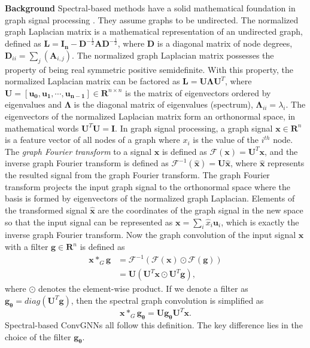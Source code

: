 	\vspace{2mm}
	\textbf{Background} Spectral-based methods have a solid mathematical foundation in graph signal processing \cite{shuman2013emerging,sandryhaila2013discrete,chen2015discrete}. They assume graphs to be undirected. The normalized graph Laplacian matrix is a mathematical representation of an undirected graph, defined as $\mathbf{L}=\mathbf{I_n}- \mathbf{D}^{-\frac{1}{2}}\mathbf{A}\mathbf{D}^{-\frac{1}{2}}$, where $\mathbf{D}$ is a diagonal matrix of node degrees, $\mathbf{D}_{ii}=\sum_j(\mathbf{A}_{i,j})$. The normalized graph Laplacian matrix possesses the property of being real symmetric positive semidefinite.  With this property, the normalized Laplacian matrix can be factored as $\mathbf{L}=\mathbf{U}\mathbf{\Lambda}\mathbf{U}^T$, where $\mathbf{U}=[\mathbf{u_0},\mathbf{u_1},\cdots,\mathbf{u_{n-1}}] \in \mathbf{R}^{n\times n}$ is the matrix of eigenvectors ordered by eigenvalues and $\mathbf{\Lambda}$ is the diagonal matrix of eigenvalues (spectrum), $\mathbf{\Lambda}_{ii}=\lambda_i$. The eigenvectors of the normalized Laplacian matrix form an orthonormal space, in mathematical words $\mathbf{U}^T\mathbf{U}=\mathbf{I}$.  In graph signal processing, a graph signal $\mathbf{x} \in  \mathbf{R}^n$ is a feature vector of all nodes of a graph where $x_i$ is the value of the $i^{th}$ node. The \textit{graph Fourier transform} to a signal $\mathbf{x}$ is defined as $\mathscr{F}(\mathbf{x}) = \mathbf{U}^T\mathbf{x}$, and the inverse graph Fourier transform  is defined as $\mathscr{F}^{-1}(\mathbf{\hat{x}}) = \mathbf{U}\hat{\mathbf{x}}$, where $\mathbf{\hat{x}}$ represents the resulted signal from the graph Fourier transform. The graph Fourier transform projects the input graph signal to the orthonormal space where the basis is formed by eigenvectors of the normalized graph Laplacian. Elements of the transformed signal $\mathbf{\hat{x}}$  are the coordinates of the graph signal in the new space so that the input signal can be represented as $\mathbf{x}=\sum_i \hat{x}_i\mathbf{u}_i$, which is exactly the inverse graph Fourier transform. Now the graph convolution of the input signal $\mathbf{x}$ with a filter $\mathbf{g}\in \mathbf{R}^n$ is defined as 
	\begin{equation}
	\label{eq:graphconv}
	\begin{aligned}
	\mathbf{x} \ast_G \mathbf{g}&= \mathscr{F}^{-1}(\mathscr{F}(\mathbf{x})\odot\mathscr{F}(\mathbf{g})) \\
	&  = \mathbf{U}(\mathbf{U}^T\mathbf{x}\odot \mathbf{U}^T \mathbf{g}),
	\end{aligned}
	\end{equation}
	where $\odot$ denotes the element-wise product.  If we denote a filter as $\mathbf{g_\theta} = diag(\mathbf{U}^T\mathbf{g})$, then the spectral graph convolution is simplified as 
	\begin{equation}
	\label{eq:2}
	\mathbf{x} \ast_G \mathbf{g_\theta} = \mathbf{U}\mathbf{g_\theta} \mathbf{U}^T\mathbf{x}.
	\end{equation}
	Spectral-based ConvGNNs all follow this definition. The key difference lies in the choice of the filter $\mathbf{g_\theta}$.
	
